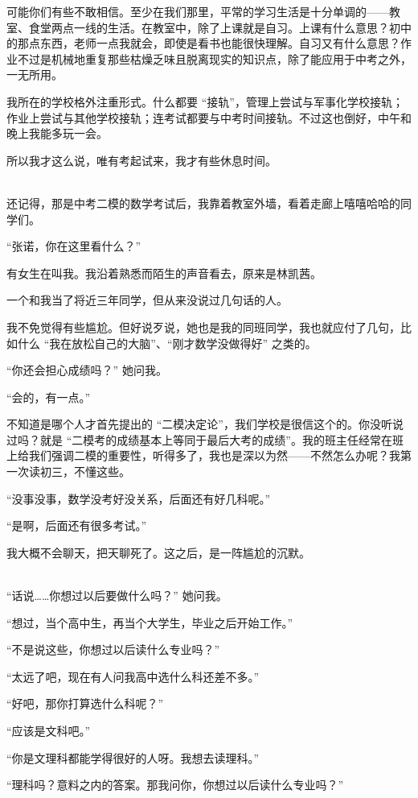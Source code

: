 \documentclass[UTF8]{ctexart}
\begin{document}
可能你们有些不敢相信。至少在我们那里，平常的学习生活是十分单调的——教室、食堂两点一线的生活。在教室中，除了上课就是自习。上课有什么意思？初中的那点东西，老师一点我就会，即使是看书也能很快理解。自习又有什么意思？作业不过是机械地重复那些枯燥乏味且脱离现实的知识点，除了能应用于中考之外，一无所用。

我所在的学校格外注重形式。什么都要 “接轨”，管理上尝试与军事化学校接轨；作业上尝试与其他学校接轨；连考试都要与中考时间接轨。不过这也倒好，中午和晚上我能多玩一会。

所以我才这么说，唯有考起试来，我才有些休息时间。

~\\

还记得，那是中考二模的数学考试后，我靠着教室外墙，看着走廊上嘻嘻哈哈的同学们。

“张诺，你在这里看什么？”

有女生在叫我。我沿着熟悉而陌生的声音看去，原来是林凯茜。

一个和我当了将近三年同学，但从来没说过几句话的人。

我不免觉得有些尴尬。但好说歹说，她也是我的同班同学，我也就应付了几句，比如什么 “我在放松自己的大脑”、“刚才数学没做得好” 之类的。

“你还会担心成绩吗？” 她问我。

“会的，有一点。”

不知道是哪个人才首先提出的 “二模决定论”，我们学校是很信这个的。你没听说过吗？就是 “二模考的成绩基本上等同于最后大考的成绩”。我的班主任经常在班上给我们强调二模的重要性，听得多了，我也是深以为然——不然怎么办呢？我第一次读初三，不懂这些。

“没事没事，数学没考好没关系，后面还有好几科呢。”

“是啊，后面还有很多考试。”

我大概不会聊天，把天聊死了。这之后，是一阵尴尬的沉默。

~\\

“话说……你想过以后要做什么吗？” 她问我。

“想过，当个高中生，再当个大学生，毕业之后开始工作。”

“不是说这些，你想过以后读什么专业吗？”

“太远了吧，现在有人问我高中选什么科还差不多。”

“好吧，那你打算选什么科呢？”

“应该是文科吧。”

“你是文理科都能学得很好的人呀。我想去读理科。”

“理科吗？意料之内的答案。那我问你，你想过以后读什么专业吗？”
\end{document}

